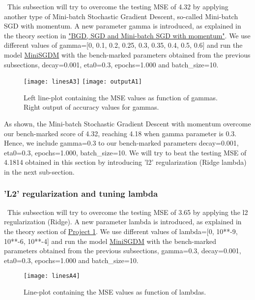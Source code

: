 \quad \, This subsection will try to overcome the testing MSE of 4.32 by applying another type of Mini-batch Stochastic Gradient Descent, so-called Mini-batch SGD with momentum. A new parameter gamma is introduced, as explained in the theory section in \hyperref[chap:BGD, SGD and Mini-batch SGD with momentum]{"BGD, SGD and Mini-batch SGD with momentum"}. We use different values of gamma=[0, 0.1, 0.2, 0.25, 0.3, 0.35, 0.4, 0.5, 0.6] and run the model \href{https://github.com/fabiorodp/UiO-FYS-STK4155/blob/master/Project2/package/gradient_descent.py}{MiniSGDM} with the bench-marked parameters obtained from the previous subsections, decay=0.001, eta0=0.3, epochs=1.000 and batch\_size=10.

\begin{figure}[H]
\label{fig:figA8}
\centering
\texttt{[image: linesA3]}
\texttt{[image: outputA1]}
\caption{Left line-plot containing the MSE values as function of gammas. Right output of accuracy values for gammas.}
\end{figure}

As shown, the Mini-batch Stochastic Gradient Descent with momentum overcome our bench-marked score of 4.32, reaching 4.18 when gamma parameter is 0.3.\\

Hence, we include gamma=0.3 to our bench-marked parameters decay=0.001, eta0=0.3, epochs=1.000, batch\_size=10. We will try to beat the testing MSE of 4.1814 obtained in this section by introducing 'l2' regularization (Ridge lambda) in the next sub-section.

\subsubsection{'L2' regularization and tuning lambda}
\label{chap:'L2' regularization and tuning lambda}

\quad \, This subsection will try to overcome the testing MSE of 3.65 by applying the l2 regularization (Ridge). A new parameter lambda is introduced, as explained in the theory section of \href{https://github.com/fabiorodp/UiO-FYS-STK4155/blob/master/Project1}{Project 1}. We use different values of lambda=[0, 10**-9, 10**-6, 10**-4] and run the model \href{https://github.com/fabiorodp/UiO-FYS-STK4155/blob/master/Project2/package/gradient_descent.py}{MiniSGDM} with the bench-marked parameters obtained from the previous subsections, gamma=0.3, decay=0.001, eta0=0.3, epochs=1.000 and batch\_size=10.

\begin{figure}[H]
\label{fig:figA9}
\centering
\texttt{[image: linesA4]}
\caption{Line-plot containing the MSE values as function of lambdas.}
\end{figure}

